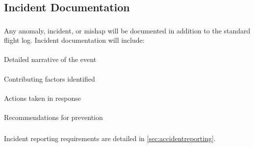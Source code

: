     \subsection{Incident Documentation}\label{ssec:incidentdocs}

        \subsubsection{} Any anomaly, incident, or mishap will be documented in addition to the standard flight log. Incident documentation will include:

            \paragraph{} Detailed narrative of the event
            \paragraph{} Contributing factors identified
            \paragraph{} Actions taken in response
            \paragraph{} Recommendations for prevention

        \subsubsection{} Incident reporting requirements are detailed in \cref{sec:accidentreporting}.

